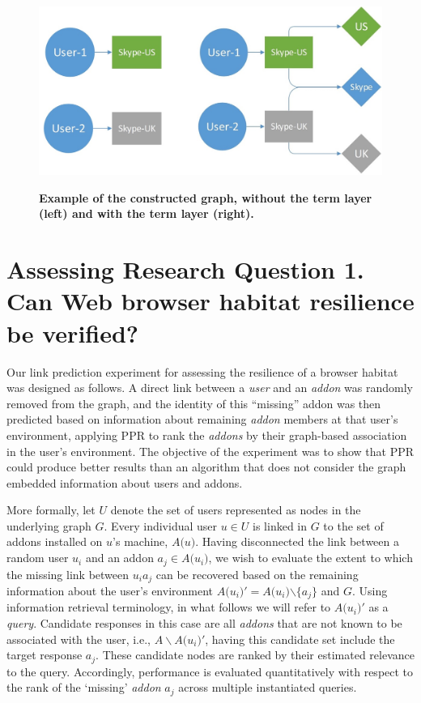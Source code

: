 \documentclass[10pt,letterpaper]{article}
\begin{document}
\begin{figure}[!h]
\caption{{\bf Example of the constructed graph, without the term layer (left) and with the term layer (right).}}
\includegraphics[width=\linewidth]{figures/skype.jpg}
\label{fig:skype}
\end{figure}

\section*{Assessing Research Question 1. Can Web browser habitat resilience be verified?}

Our link prediction experiment for assessing the resilience of a browser habitat was designed as follows. A direct link between a \textit{user} and an\textit{ addon} was randomly removed from the graph, and the identity of this ``missing'' addon was then predicted based on information about remaining \textit{addon} members at that user's environment, applying PPR to rank the \textit{addons} by their graph-based association in the user's environment. The objective of the experiment was to show that PPR could produce better results than an algorithm that does not consider the graph embedded information about users and addons. 

More formally, let $U$ denote the set of users represented as nodes in the underlying graph $G$. Every individual user $u\mathrm{\in }U$ is linked in $G$ to the set of addons installed on $u$'s machine, $A\mathrm{(}u\mathrm{)}$. Having disconnected the link between a random user $u_i$ and an addon $a_j\mathrm{\in }A\mathrm{(}u_i\mathrm{)}$, we wish to evaluate the extent to which the missing link between $u_ia_j$ can be recovered based on the remaining information about the user's environment $A\mathrm{(}u_i\mathrm{)'=}A\mathrm{(}u_i\mathrm{)}\mathrm{\backslash }\mathrm{\{}a_j\}$ and $G$. Using information retrieval terminology, in what follows we will refer to $A\mathrm{(}u_i\mathrm{)'}$ as a \textit{query}. Candidate responses in this case are all\textit{ addons} that are not known to be associated with the user, i.e., $A\backslash A\mathrm{(}u_i\mathrm{)'}$, having this candidate set include the target response $a_j$. These candidate nodes are ranked by their estimated relevance to the query. Accordingly, performance is evaluated quantitatively with respect to the rank of the `missing'\textit{ addon} $a_j$ across multiple instantiated queries.
\end{document}
